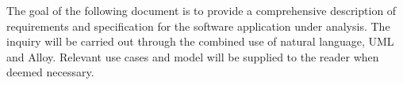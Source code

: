 \documentclass[../../main.tex]{subfiles}
\begin{document}
The goal of the following document is to provide a comprehensive description of requirements and specification for the software application under analysis. The inquiry will be carried out through the combined use of natural language, UML and Alloy. Relevant use cases and model will be supplied to the reader when deemed necessary.
\end{document}
